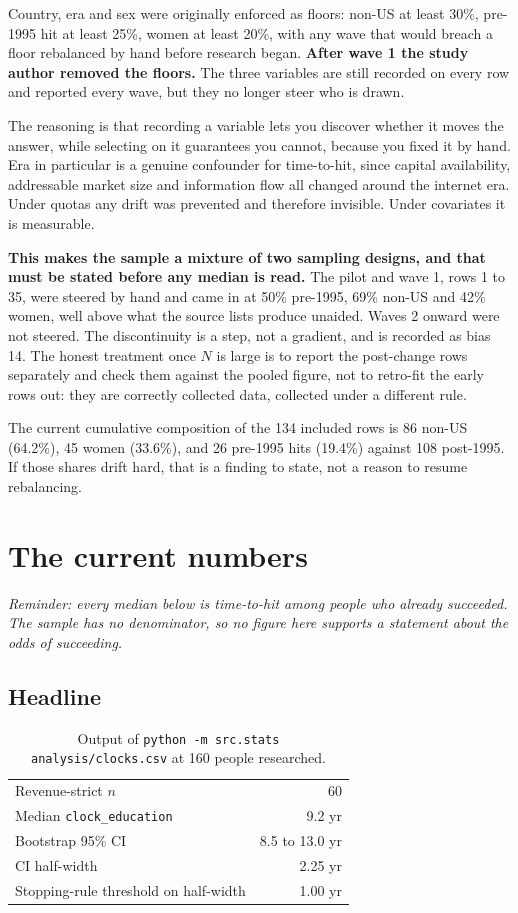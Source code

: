 \documentclass[11pt]{article}
\newcommand{\caveat}{\emph{\small Reminder: every median below is time-to-hit
among people who already succeeded. The sample has no denominator, so no figure
here supports a statement about the odds of succeeding.}\par\medskip}
\begin{document}
Country, era and sex were originally enforced as floors: non-US at least 30\%,
pre-1995 hit at least 25\%, women at least 20\%, with any wave that would
breach a floor rebalanced by hand before research began. \textbf{After wave 1
the study author removed the floors.} The three variables are still recorded on
every row and reported every wave, but they no longer steer who is drawn.

The reasoning is that recording a variable lets you discover whether it moves
the answer, while selecting on it guarantees you cannot, because you fixed it
by hand. Era in particular is a genuine confounder for time-to-hit, since
capital availability, addressable market size and information flow all changed
around the internet era. Under quotas any drift was prevented and therefore
invisible. Under covariates it is measurable.

\textbf{This makes the sample a mixture of two sampling designs, and that must
be stated before any median is read.} The pilot and wave 1, rows 1 to 35, were
steered by hand and came in at 50\% pre-1995, 69\% non-US and 42\% women, well
above what the source lists produce unaided. Waves 2 onward were not steered.
The discontinuity is a step, not a gradient, and is recorded as bias 14. The
honest treatment once $N$ is large is to report the post-change rows separately
and check them against the pooled figure, not to retro-fit the early rows out:
they are correctly collected data, collected under a different rule.

The current cumulative composition of the 134 included rows is 86 non-US
(64.2\%), 45 women (33.6\%), and 26 pre-1995 hits (19.4\%) against 108
post-1995. If those shares drift hard, that is a finding to state, not a reason
to resume rebalancing.

\section{The current numbers}

\caveat

\subsection{Headline}

\begin{table}[h]
\centering
\begin{tabular}{lr}
\toprule
Revenue-strict $n$ & 60 \\
Median \texttt{clock\_education} & 9.2 yr \\
Bootstrap 95\% CI & 8.5 to 13.0 yr \\
CI half-width & 2.25 yr \\
Stopping-rule threshold on half-width & 1.00 yr \\
\bottomrule
\end{tabular}
\caption{Output of \texttt{python -m src.stats analysis/clocks.csv} at 160
people researched.}
\end{table}
\end{document}
